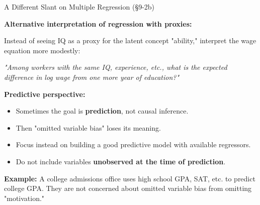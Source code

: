 \documentclass[aspectratio=169, 12pt]{beamer}
\begin{document}
\begin{frame}[shrink=20]{A Different Slant on Multiple Regression (\S9-2b)}

  \textbf{Alternative interpretation of regression with proxies:}

  \begin{keybox}
    Instead of seeing IQ as a proxy for the latent concept "ability," interpret the wage
    equation more modestly:

    \medskip
    \emph{"Among workers with the same IQ, experience, etc., what is the expected difference
    in log wage from one more year of education?"}
  \end{keybox}

  \begin{highlightbox}
    \textbf{Predictive perspective:}
    \begin{itemize}\setlength{\itemsep}{1pt}
      \item Sometimes the goal is \textbf{prediction}, not causal inference.
      \item Then "omitted variable bias" loses its meaning.
      \item Focus instead on building a good predictive model with available regressors.
      \item Do not include variables \textbf{unobserved at the time of prediction}.
    \end{itemize}
  \end{highlightbox}

  \textbf{Example:} A college admissions office uses high school GPA, SAT, etc. to predict
  college GPA. They are not concerned about omitted variable bias from omitting "motivation."

\end{frame}
\end{document}
